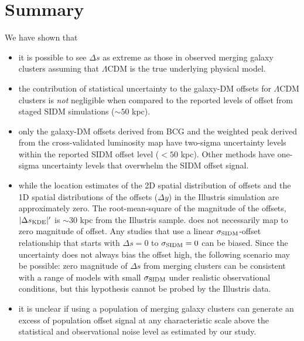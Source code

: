 \section{Summary}
We have shown that 
\begin{itemize}
		\item it is possible to  
			see $\Delta s$ as extreme as those in observed merging galaxy clusters assuming that
			$\Lambda$CDM is the true underlying physical model.  \\

		\item the contribution of statistical uncertainty to the galaxy-DM offsets 
			for $\Lambda$CDM clusters is {\it not} negligible when compared to the reported
			levels of offset from staged SIDM simulations ($\sim 50$ kpc).\\ 

		\item only the galaxy-DM offsets derived from BCG and the weighted peak
			derived from the cross-validated
			luminosity map have two-sigma uncertainty levels within the reported SIDM offset
			level ($< 50$ kpc). Other methods have one-sigma uncertainty levels that overwhelm the
			SIDM offset signal.\\ 

		\item while the location estimates of the 2D spatial distribution of offsets and the
			1D spatial distributions of the offsets ($\Delta y$) in the Illustris
			simulation are approximately zero.
			The root-mean-square of the magnitude of the
		offsets, $|\Delta s_{\rm KDE}|'$ is $\sim 30$ kpc from the Illustris sample. 
			does not necessarily map to zero magnitude of offset.  
			Any studies that use a linear $\sigma_{\rm SIDM}$-offset relationship
			that starts with $\Delta s = 0$ to $\sigma_{\rm SIDM} = 0$ can be biased. 
			Since the uncertainty does not always bias the offset high, 
		the following scenario may be possible: zero magnitude of
			$\Delta s$ from merging clusters 
			can be consistent with a range of models with small
			$\sigma_{\rm SIDM}$ under realistic observational conditions,
			but this hypothesis cannot be probed by the Illustris data.\\
  
	 \item it is unclear if using a population of merging galaxy clusters 
		 can generate an excess of population offset signal at any characteristic
		 scale above the statistical
		 and observational noise level as estimated by our study.   
			\\


\end{itemize}
